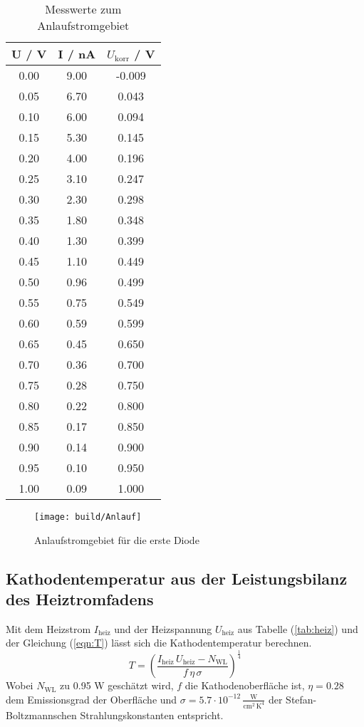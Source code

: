 \begin{table}[H] %
  \centering
  \begin{tabular}{c | c | c}
    \toprule
    U / V & I / nA & $U_\text{korr}$ / V \\
    \midrule
    0.00 & 9.00 &-0.009 \\
    0.05 & 6.70 & 0.043 \\
    0.10 & 6.00 & 0.094 \\
    0.15 & 5.30 & 0.145 \\
    0.20 & 4.00 & 0.196 \\
    0.25 & 3.10 & 0.247 \\
    0.30 & 2.30 & 0.298 \\
    0.35 & 1.80 & 0.348 \\
    0.40 & 1.30 & 0.399 \\
    0.45 & 1.10 & 0.449 \\
    0.50 & 0.96 & 0.499 \\
    0.55 & 0.75 & 0.549 \\
    0.60 & 0.59 & 0.599 \\
    0.65 & 0.45 & 0.650 \\
    0.70 & 0.36 & 0.700 \\
    0.75 & 0.28 & 0.750 \\
    0.80 & 0.22 & 0.800 \\
    0.85 & 0.17 & 0.850 \\
    0.90 & 0.14 & 0.900 \\
    0.95 & 0.10 & 0.950 \\
    1.00 & 0.09 & 1.000 \\
    \bottomrule
  \end{tabular}
  \caption{Messwerte zum Anlaufstromgebiet}
  \label{tab:Messdaten2}
\end{table}

\begin{figure}[H]
  \centering
  \texttt{[image: build/Anlauf]}
  \caption{Anlaufstromgebiet für die erste Diode}
  \label{fig:anlauf}
\end{figure}

\subsection{Kathodentemperatur aus der Leistungsbilanz des Heiztromfadens}
\label{sec:L}
Mit dem Heizstrom $I_\text{heiz}$ und der Heizspannung $U_\text{heiz}$ aus Tabelle (\ref{tab:heiz}) und der Gleichung (\ref{eqn:T}) lässt sich die Kathodentemperatur berechnen.
\begin{equation}
  T = \left(\frac{I_\text{heiz}\, U_\text{heiz} - N_\text{WL}}{f\, \eta\, \sigma}\right)^{\frac{1}{4}}
  \label{eqn:T}
\end{equation}
Wobei $N_\text{WL}$ zu 0.95 W geschätzt wird, $f$ die Kathodenoberfläche ist, $\eta = 0.28$ dem Emissionsgrad der Oberfläche und $\sigma = 5.7 \cdot 10^{-12} \, \frac{\text{W}}{\text{cm}^2\, \text{K}^4}$ der Stefan-Boltzmannschen Strahlungskonstanten entspricht.

